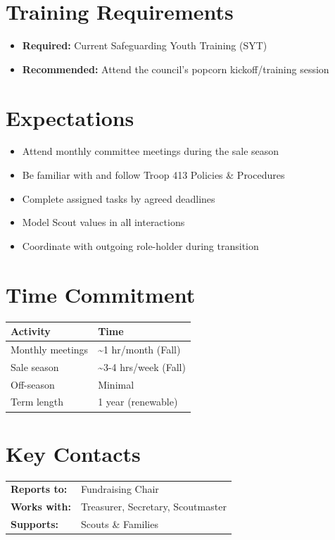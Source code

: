 \documentclass[11pt, letterpaper]{article}
\begin{document}
\begin{minipage}[t]{0.48\linewidth}
\section{Training Requirements}
\begin{itemize}
  \item \textbf{Required:} Current Safeguarding Youth Training (SYT)
  \item \textbf{Recommended:} Attend the council's popcorn kickoff/training session
\end{itemize}

\end{minipage}
\hfill
\begin{minipage}[t]{0.48\linewidth}
\raggedright

\section{Expectations}
\begin{itemize}
  \item Attend monthly committee meetings during the sale season
  \item Be familiar with and follow Troop 413 Policies \& Procedures
  \item Complete assigned tasks by agreed deadlines
  \item Model Scout values in all interactions
  \item Coordinate with outgoing role-holder during transition
\end{itemize}

\section{Time Commitment}
\begin{tabular}{@{}p{3.0cm} p{3.8cm}@{}}
  \toprule
  \textbf{Activity} & \textbf{Time} \\
  \midrule
  Monthly meetings  & \textasciitilde{}1 hr/month (Fall) \\
  Sale season       & \textasciitilde{}3-4 hrs/week (Fall) \\
  Off-season        & Minimal \\
  Term length       & 1 year (renewable) \\
  \bottomrule
\end{tabular}

\vspace{1em}

\section{Key Contacts}
\begin{tabular}{@{}p{2.6cm} >{\raggedright\arraybackslash}p{4.2cm}@{}}
  \textbf{Reports to:}  & Fundraising Chair \\
  \textbf{Works with:}  & Treasurer, Secretary, Scoutmaster \\
  \textbf{Supports:}    & Scouts \& Families \\
\end{tabular}

\end{minipage}
\end{document}
